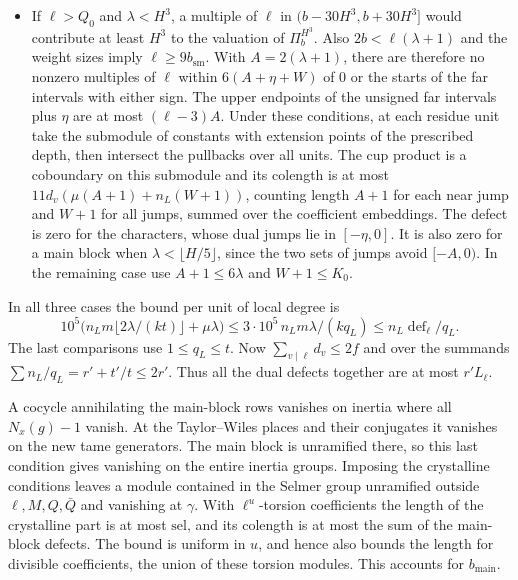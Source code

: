 \begin{itemize}
\item If \(\ell>Q_0\) and \(\lambda<H^3\), a multiple of \(\ell\) in
\((b-30H^3,b+30H^3]\) would contribute at least \(H^3\) to the valuation of \(\Pi_b^{H^3}\).
Also \(2b<\ell(\lambda+1)\) and the weight sizes imply \(\ell\ge9b_{\mathrm{sm}}\).
With \(A=2(\lambda+1)\), there are therefore no nonzero multiples of \(\ell\) within
\(6(A+\eta+W)\) of \(0\) or the starts of the far intervals with either sign.
The upper endpoints of the unsigned far intervals plus \(\eta\) are at most \((\ell-3)A\).
Under these conditions, at each residue unit take the submodule of constants with extension
points of the prescribed depth, then intersect the pullbacks over all units.
The cup product is a coboundary on this submodule and its colength is at most
\(11d_v(\mu(A+1)+n_L(W+1))\), counting length \(A+1\) for each near jump and \(W+1\)
for all jumps, summed over the coefficient embeddings.
The defect is zero for the characters, whose dual jumps lie in \([-\eta,0]\).
It is also zero for a main block when \(\lambda<\lfloor H/5\rfloor\), since the two sets
of jumps avoid \([-A,0)\). In the remaining case use \(A+1\le6\lambda\) and \(W+1\le K_0\).
\end{itemize}

In all three cases the
bound per unit of local degree is
\[
 10^5\bigl(n_L m\lfloor 2\lambda/(kt)\rfloor+\mu\lambda\bigr)
 \le 3\cdot10^5\,n_L m\lambda/(kq_L)
 \le n_L\operatorname{def}_\ell/q_L.
\]
The last comparisons use \(1\le q_L\le t\).
Now \(\sum_{v\mid\ell}d_v\le2f\) and over the summands
\(\sum n_L/q_L=r'+t'/t\le2r'\). Thus all the dual defects
together are at most \(r'L_\ell\).

A cocycle annihilating the main-block rows vanishes on inertia
where all \(N_x(g)-1\) vanish. At the Taylor--Wiles places and
their conjugates it vanishes on the new tame generators.
The main block is unramified there, so this last condition
gives vanishing on the entire inertia groups.
Imposing the crystalline conditions leaves a module contained
in the Selmer group unramified outside \(\ell,M,Q,\bar Q\)
and vanishing at \(\gamma\). With \(\ell^u\)-torsion coefficients
the length of the crystalline part is at most \(\mathrm{sel}\),
and its colength is at most the sum of the main-block defects.
The bound is uniform in \(u\), and hence also bounds the length
for divisible coefficients, the union of these torsion modules.
This accounts for \(b_{\mathrm{main}}\).

